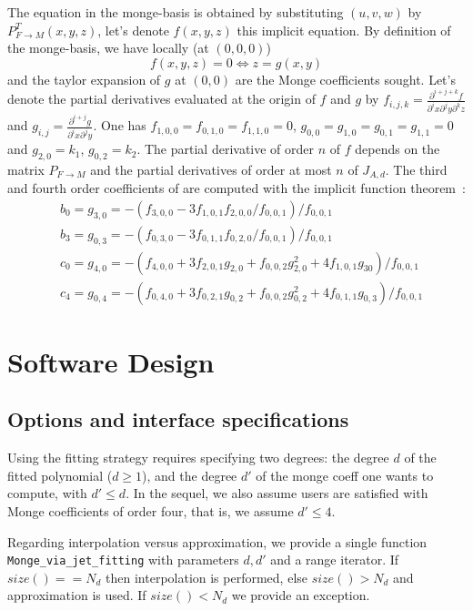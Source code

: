 The equation in the monge-basis is obtained by substituting $(u,v,w)$
by $P^T_{F\rightarrow M}(x,y,z)$, let's denote $f(x,y,z)$ this implicit
equation. By definition of the monge-basis, we have locally (at
$(0,0,0)$)
\begin{equation}
f(x,y,z)=0 \Leftrightarrow z=g(x,y)
\end{equation}
and the taylor expansion of $g$ at $(0,0)$ are the Monge coefficients
sought.
%
Let's denote the partial derivatives evaluated at the origin of $f$
and $g$ by $f_{i,j,k}=\frac{\partial^{i+j+k}f}{\partial^ix
\partial^jy \partial^kz}$ and $g_{i,j}=\frac{\partial^{i+j}g}{\partial^ix
\partial^jy}$. One has $f_{1,0,0}=f_{0,1,0}=f_{1,1,0}=0$,
$g_{0,0}=g_{1,0}=g_{0,1}=g_{1,1}=0$ and $g_{2,0}=k_1$,
$g_{0,2}=k_2$. The partial derivative of order $n$ of $f$ depends on
the matrix $P_{F\rightarrow M}$ and the partial derivatives of order
at most $n$ of $J_{A,d}$. The third and fourth order coefficients of are
computed with the implicit function theorem~:
\begin{eqnarray*}
&b_0=g_{3,0}=-(f_{3,0,0}-3f_{1,0,1}f_{2,0,0}/f_{0,0,1})/f_{0,0,1}\\
&b_3=g_{0,3}=-(f_{0,3,0}-3f_{0,1,1}f_{0,2,0}/f_{0,0,1})/f_{0,0,1}\\
&c_0=g_{4,0}=-(f_{4,0,0}+3f_{2,0,1}g_{2,0}+f_{0,0,2}g_{2,0}^2
+4f_{1,0,1}g_{30})/f_{0,0,1}\\
&c_4=g_{0,4}=-(f_{0,4,0}+3f_{0,2,1}g_{0,2}+f_{0,0,2}g_{0,2}^2
+4f_{0,1,1}g_{0,3})/f_{0,0,1}
\end{eqnarray*} 

\section{Software Design}
\subsection{Options and interface specifications}

Using the fitting strategy requires specifying two degrees: the degree
$d$ of the fitted polynomial ($d \geq 1$), and the degree $d'$ of the
monge coeff one wants to compute, with $d' \leq d $.  In the sequel,
we also assume users are satisfied with Monge coefficients of order
four, that is, we assume $d' \leq 4$.
\medskip

Regarding interpolation versus approximation, we provide a single
function {\tt Monge\_via\_jet\_fitting} with parameters $d,d'$ and a
range iterator. If $size()==N_d$ then interpolation is performed, else
$size() > N_d$ and approximation is used. If $size()< N_d$ we provide
an exception.


